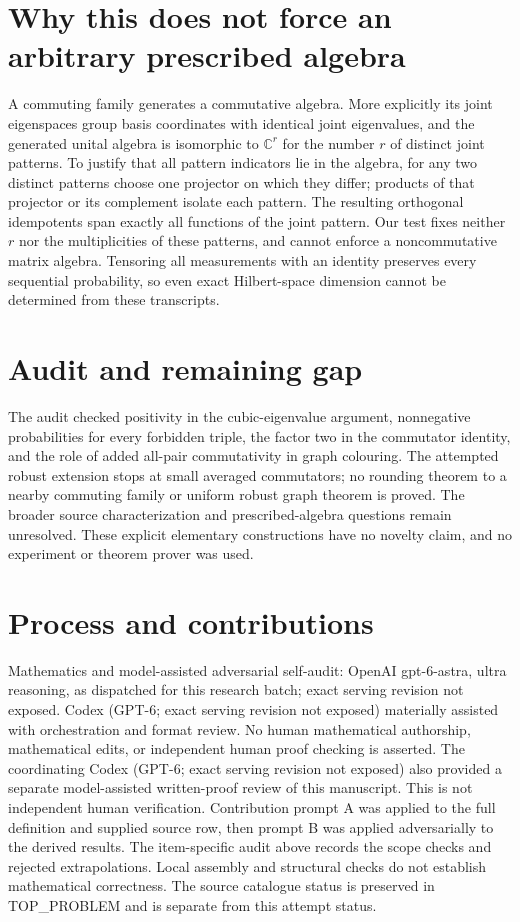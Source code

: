 \documentclass[11pt]{article}
\begin{document}
\section{Why this does not force an arbitrary prescribed algebra}
A commuting family generates a commutative algebra. More
explicitly its joint eigenspaces group basis coordinates with
identical joint eigenvalues, and the generated unital algebra is
isomorphic to $\mathbb C^r$ for the number $r$ of distinct joint
patterns. To justify that all pattern indicators lie in the
algebra, for any two distinct patterns choose one projector
on which they differ; products of that projector or its
complement isolate each pattern. The resulting orthogonal
idempotents span exactly all functions of the joint pattern.
Our test fixes neither $r$ nor the multiplicities of these
patterns, and cannot enforce a noncommutative matrix algebra.
Tensoring all measurements with an identity preserves every
sequential probability, so even exact Hilbert-space dimension
cannot be determined from these transcripts.

\section{Audit and remaining gap}
The audit checked positivity in the cubic-eigenvalue argument,
nonnegative probabilities for every forbidden triple, the factor
two in the commutator identity, and the role of added all-pair
commutativity in graph colouring. The attempted robust extension
stops at small averaged commutators; no rounding theorem to a
nearby commuting family or uniform robust graph theorem is
proved. The broader source characterization and prescribed-algebra
questions remain unresolved. These explicit elementary constructions
have no novelty claim, and no experiment or theorem prover was used.

\section{Process and contributions}
Mathematics and model-assisted adversarial self-audit: OpenAI gpt-6-astra, ultra reasoning, as dispatched for this research batch; exact serving revision not exposed. Codex (GPT-6; exact serving revision not exposed) materially assisted with orchestration and format review. No human mathematical authorship, mathematical edits, or independent human proof checking is asserted.
The coordinating Codex (GPT-6; exact serving revision not exposed) also provided a separate model-assisted written-proof review of this manuscript. This is not independent human verification.
Contribution prompt A was applied to the full definition and supplied source row, then prompt B was applied adversarially to the derived results. The item-specific audit above records the scope checks and rejected extrapolations. Local assembly and structural checks do not establish mathematical correctness. The source catalogue status is preserved in TOP\_PROBLEM and is separate from this attempt status.
\end{document}
